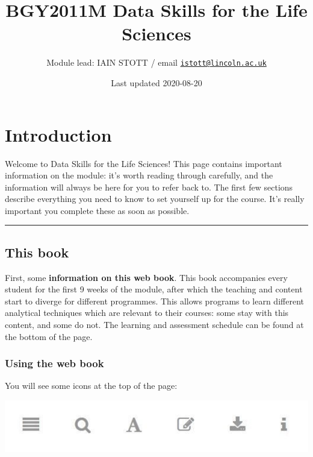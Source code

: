 \documentclass[
]{book}
\title{BGY2011M Data Skills for the Life Sciences}
\author{Module lead: IAIN STOTT / email \href{mailto:istott@lincoln.ac.uk}{\nolinkurl{istott@lincoln.ac.uk}}}
\date{Last updated 2020-08-20}
\begin{document}
\maketitle

{
\setcounter{tocdepth}{1}
\tableofcontents
}
\hypertarget{introduction}{%
\chapter{Introduction}\label{introduction}}

Welcome to Data Skills for the Life Sciences! This page contains important
information on the module: it's worth reading through carefully, and the
information will always be here for you to refer back to. The first few sections
describe everything you need to know to set yourself up for the course. It's
really important you complete these as soon as possible.\\
\hspace*{0.333em}

\begin{center}\rule{0.5\linewidth}{0.5pt}\end{center}

\hypertarget{this-book}{%
\section{This book}\label{this-book}}

First, some \textbf{information on this web book}. This book accompanies every student for
the first 9 weeks of the module, after which the teaching and content start
to diverge for different programmes. This allows programs to learn different
analytical techniques which are relevant to their courses: some stay with this
content, and some do not. The learning and assessment schedule can be found at
the bottom of the page.

\hypertarget{using-the-web-book}{%
\subsection{Using the web book}\label{using-the-web-book}}

You will see some icons at the top of the page:

\includegraphics{gitbook_icons.jpg}
\end{document}

